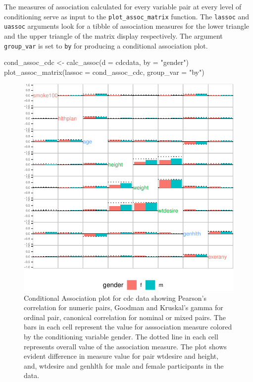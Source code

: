 The measures of association calculated for every variable pair at every
level of conditioning serve as input to the \texttt{plot\_assoc\_matrix}
function. The \texttt{lassoc} and \texttt{uassoc} arguments look for a
tibble of association measures for the lower triangle and the upper
triangle of the matrix display respectively. The argument
\texttt{group\_var} is set to \texttt{by} for producing a conditional
association plot.

\begin{Schunk}
\begin{Sinput}
cond_assoc_cdc <- calc_assoc(d = cdcdata, 
                             by = "gender")
plot_assoc_matrix(lassoc = cond_assoc_cdc,
                  group_var = "by")
\end{Sinput}
\begin{figure}

{\centering \includegraphics{rj_paper_files/figure-latex/cond-assoc-1} 

}

\caption[Conditional Association plot for cdc data showing Pearson's correlation for numeric pairs, Goodman and Kruskal's gamma for ordinal pair, canonical correlation for nominal or mixed pairs]{Conditional Association plot for cdc data showing Pearson's correlation for numeric pairs, Goodman and Kruskal's gamma for ordinal pair, canonical correlation for nominal or mixed pairs. The bars in each cell represent the value for asssociation measure colored by the conditioning variable gender. The dotted line in each cell represents overall value of the association measure. The plot shows evident difference in measure value for pair wtdesire and height, and, wtdesire and genhlth for male and female participants in the data.}\label{fig:cond-assoc}
\end{figure}
\end{Schunk}

